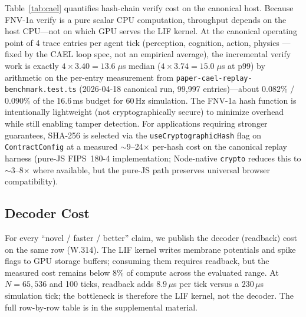 \documentclass[10pt]{article}
\begin{document}
Table~\ref{tab:cael} quantifies hash-chain verify cost on the canonical host.
Because FNV-1a verify is a pure scalar CPU computation, throughput depends on
the host CPU---not on which GPU serves the LIF kernel.
At the canonical operating point of 4 trace entries per agent tick
(perception, cognition, action, physics — fixed by the CAEL loop spec,
not an empirical average), the incremental verify work is exactly
$4 \times 3.40 = 13.6\;\mu$s median ($4 \times 3.74 = 15.0\;\mu$s at p99)
by arithmetic on the per-entry measurement from \texttt{paper-cael-replay-benchmark.test.ts}
(2026-04-18 canonical run, 99{,}997 entries)---about $0.082\%$ /
$0.090\%$ of the 16.6\,ms budget for 60\,Hz simulation.
The FNV-1a hash function is intentionally lightweight (not cryptographically
secure) to minimize overhead while still enabling tamper detection.
For applications requiring stronger guarantees, SHA-256 is selected via
the \texttt{useCryptographicHash} flag on \texttt{ContractConfig} at a
measured $\sim$9--24$\times$ per-hash cost on the canonical replay
harness (pure-JS FIPS~180-4 implementation; Node-native
\texttt{crypto} reduces this to $\sim$3--8$\times$ where available, but
the pure-JS path preserves universal browser compatibility).
\fi


\subsection{Decoder Cost}
\label{sec:decoder-cost}

For every ``novel / faster / better'' claim, we publish the decoder (readback) cost on the same row (W.314).
The LIF kernel writes membrane potentials and spike flags to GPU storage buffers;
consuming them requires readback, but the measured cost remains below $8\%$ of
compute across the evaluated range.
At $N=65{,}536$ and 100 ticks, readback adds $8.9\,\mu$s per tick versus a
$230\,\mu$s simulation tick; the bottleneck is therefore the LIF kernel, not
the decoder.
The full row-by-row table is in the supplemental material.
\end{document}
